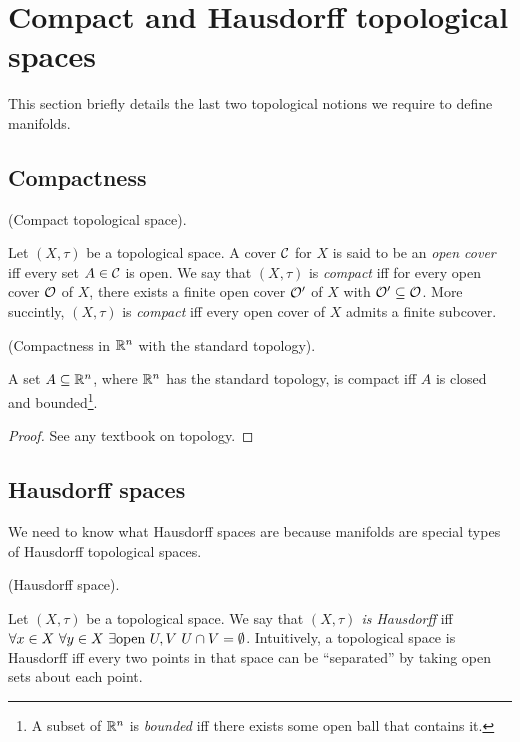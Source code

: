 \section*{Compact and Hausdorff topological spaces}

This section briefly details the last two topological notions we require to define manifolds.

\subsection*{Compactness}

\begin{defn}
    (Compact topological space).
    
    Let $(X, \tau)$ be a topological space. A cover $\mathcal{C}$ for $X$ is said to be an \textit{open cover} iff every set $A \in \mathcal{C}$ is open. We say that $(X, \tau)$ is \textit{compact} iff for every open cover $\mathcal{O}$ of $X$, there exists a finite open cover $\mathcal{O}'$ of $X$ with $\mathcal{O}' \subseteq \mathcal{O}$. More succintly, $(X, \tau)$ is \textit{compact} iff every open cover of $X$ admits a finite subcover.
\end{defn}

\begin{theorem}
    (Compactness in $\mathbb{R}^n$ with the standard topology).
    
    A set $A \subseteq \mathbb{R}^n$, where $\mathbb{R}^n$ has the standard topology, is compact iff $A$ is closed and bounded\footnote{A subset of $\mathbb{R}^n$ is \textit{bounded} iff there exists some open ball that contains it.}.
\end{theorem}

\begin{proof}
    See any textbook on topology.
\end{proof}

\subsection*{Hausdorff spaces}

We need to know what Hausdorff spaces are because manifolds are special types of Hausdorff topological spaces.

\begin{defn}
    (Hausdorff space).
    
    Let $(X, \tau)$ be a topological space. We say that \textit{$(X, \tau)$ is Hausdorff} iff $\forall x \in X \text{ } \forall y \in X \text{ } \exists \text{open } U, V \text{ } U \cap V = \emptyset$. Intuitively, a topological space is Hausdorff iff every two points in that space can be ``separated'' by taking open sets about each point.
\end{defn}

